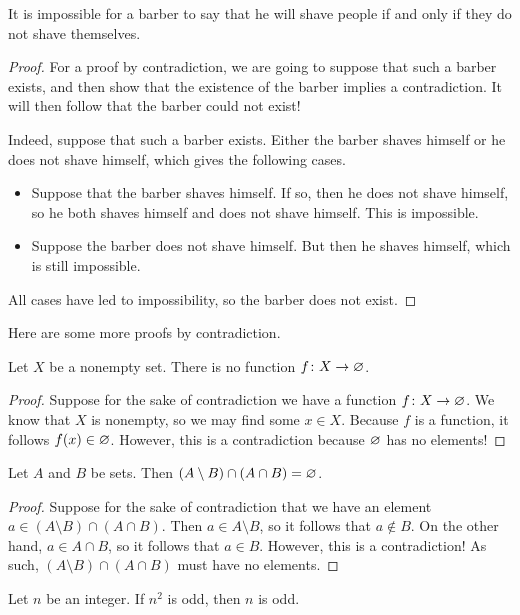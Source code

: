 \documentclass[../notes.tex]{subfiles}
\begin{document}
\begin{example} \label{exe:barber-diagonalization} %
    It is impossible for a barber to say that he will shave people if and only if they do not shave themselves.
\end{example}
\begin{proof}
    For a proof by contradiction, we are going to suppose that such a barber exists, and then show that the existence of the barber implies a contradiction. It will then follow that the barber could not exist!
    
    Indeed, suppose that such a barber exists. Either the barber shaves himself or he does not shave himself, which gives the following cases.
    \begin{itemize}
        \item Suppose that the barber shaves himself. If so, then he does not shave himself, so he both shaves himself and does not shave himself. This is impossible.
        \item Suppose the barber does not shave himself. But then he shaves himself, which is still impossible.
    \end{itemize}
    All cases have led to impossibility, so the barber does not exist.
\end{proof}
Here are some more proofs by contradiction.
\begin{example}
    Let $X$ be a nonempty set. There is no function $f\colon X\to\varnothing$.
\end{example}
\begin{proof}
    Suppose for the sake of contradiction we have a function $f\colon X\to\varnothing$. We know that $X$ is nonempty, so we may find some $x\in X$. Because $f$ is a function, it follows $f(x)\in\varnothing$. However, this is a contradiction because $\varnothing$ has no elements!
\end{proof}
\begin{example}
    Let $A$ and $B$ be sets. Then $(A\setminus B)\cap(A\cap B)=\varnothing$.
\end{example}
\begin{proof}
    Suppose for the sake of contradiction that we have an element $a\in(A\setminus B)\cap(A\cap B)$. Then $a\in A\setminus B$, so it follows that $a\notin B$. On the other hand, $a\in A\cap B$, so it follows that $a\in B$. However, this is a contradiction! As such, $(A\setminus B)\cap(A\cap B)$ must have no elements.
\end{proof}
\begin{example} \label{exe:odd-square-to-odd}
    Let $n$ be an integer. If $n^2$ is odd, then $n$ is odd.
\end{example}
\end{document}
